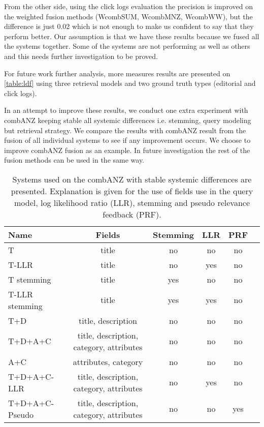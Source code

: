 From the other side, using the click logs evaluation the precision is improved on the weighted fusion methods (WcombSUM, WcombMNZ, WcombWW), but the difference is just 0.02 which is not enough to make us confident to say that they perform better. Our assumption is that we have these results because we fused all the systems together. Some of the systems are not performing as well as others and this needs further investigation to be proved.


For future work further analysis, more measures results are presented on \ref{table:ldf} using three retrieval models and two ground truth types (editorial and click logs).

In an attempt to improve these results, we conduct one extra experiment with combANZ keeping stable all systemic differences i.e. stemming, query modeling but retrieval strategy. We compare the results with combANZ result from the fusion of all individual systems to see if any improvement occurs. We choose to improve combANZ fusion as an example. In future investigation the rest of the fusion methods can be used in the same way.



\begin{table}[H]
\begin{center}
\scriptsize
\caption{Systems used on the combANZ with stable systemic differences are presented. Explanation is given for the use of fields use in the query model, log likelihood ratio (LLR), stemming and pseudo relevance feedback (PRF). }
\label{table:combANZSystems}

\begin{tabular}{lccccr}
\midrule
Name & Fields & Stemming & LLR & PRF \\
\midrule
T & title & no & no & no \\
T-LLR & title & no & yes & no \\
T stemming & title & yes & no & no \\
T-LLR stemming & title & yes & yes & no \\
T+D  & title, description & no & no & no \\
T+D+A+C & title, description, category, attributes & no & no & no \\
A+C & attributes, category & no & no & no \\
T+D+A+C-LLR & title, description, category, attributes & no & yes & no \\
T+D+A+C-Pseudo & title, description, category, attributes & no & no & yes \\
\bottomrule
\end{tabular}
\end{center}
\end{table}



